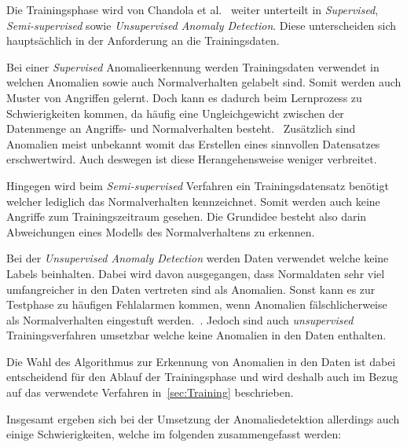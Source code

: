                 Die Trainingsphase wird von Chandola et al.~\cite{ANOMALYSURVEY} weiter unterteilt in \textit{Supervised},
                \textit{Semi-supervised} sowie \textit{Unsupervised Anomaly Detection}.
                Diese unterscheiden sich hauptsächlich in der Anforderung an die Trainingsdaten. 
                
                Bei einer \textit{Supervised} Anomalieerkennung werden Trainingsdaten verwendet 
                in welchen Anomalien sowie auch Normalverhalten gelabelt sind.
                Somit werden auch Muster von Angriffen gelernt.
                Doch kann es dadurch beim Lernprozess zu Schwierigkeiten kommen, da häufig eine Ungleichgewicht zwischen der Datenmenge an Angriffs- und Normalverhalten besteht.~\cite{IMBALANCEPHUA2004}
                Zusätzlich sind Anomalien meist unbekannt womit das Erstellen eines sinnvollen Datensatzes erschwertwird.
                Auch deswegen ist diese Herangehensweise weniger verbreitet.~\cite{UNSUPERVISEDGOLDSTEIN2016}

                
                Hingegen wird beim \textit{Semi-supervised} Verfahren ein Trainingsdatensatz benötigt welcher lediglich das Normalverhalten kennzeichnet.
                Somit werden auch keine Angriffe zum Trainingszeitraum gesehen.
                Die Grundidee besteht also darin Abweichungen eines Modells des Normalverhaltens zu erkennen.
            
                
                Bei der \textit{Unsupervised Anomaly Detection} werden Daten verwendet welche keine Labels beinhalten.
                Dabei wird davon ausgegangen, dass Normaldaten sehr viel umfangreicher in den Daten vertreten sind als Anomalien.
                Sonst kann es zur Testphase zu häufigen Fehlalarmen kommen, wenn Anomalien fälschlicherweise als Normalverhalten eingestuft werden.~\cite{ANOMALYSURVEY2}.
                Jedoch sind auch \textit{unsupervised} Trainingsverfahren umsetzbar welche keine Anomalien in den Daten enthalten.\cite{UNSUPERVISEDGOLDSTEIN2016}

                Die Wahl des Algorithmus zur Erkennung von Anomalien in den Daten ist dabei entscheidend für den Ablauf der Trainingsphase und wird deshalb auch im Bezug auf das verwendete Verfahren in~\autoref{sec:Training} beschrieben.

                Insgesamt ergeben sich bei der Umsetzung der Anomaliedetektion allerdings auch einige Schwierigkeiten, welche im folgenden zusammengefasst werden:

